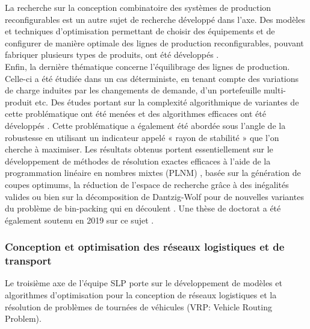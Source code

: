 La recherche sur la conception combinatoire des systèmes de production reconfigurables est un autre sujet de recherche développé dans l’axe. Des modèles et techniques d'optimisation permettant de choisir des équipements et de configurer de manière optimale des lignes de production reconfigurables, pouvant fabriquer plusieurs types de produits, ont été développés \cite{battaia:hal-01435089,battaia:hal-01523726,Dolgui2019,Dolgui2020,Battaia2020,yelleschaouche:hal-02485673}.\\

Enfin, la dernière thématique concerne l’équilibrage des lignes de production. Celle-ci a été étudiée dans un cas déterministe, en tenant compte des variations de charge induites par les changements de demande, d’un portefeuille multi-produit etc. Des études portant sur la complexité algorithmique de variantes de cette problématique ont été menées et des algorithmes efficaces ont été développés \cite{dolgui:hal-01688688,delorme:emse-01840007}. Cette problématique a également été abordée sous l’angle de la robustesse en utilisant un indicateur appelé « rayon de stabilité » que l’on cherche à maximiser. Les résultats obtenus portent essentiellement sur le développement de méthodes de résolution exactes efficaces à l’aide de la programmation linéaire en nombres mixtes (PLNM) \cite{rossi:hal-01301625}, basée sur la génération de coupes optimums, la réduction de l’espace de recherche grâce à des inégalités valides \cite{pirogov:hal-01614455,pirogov:hal-01832920,pirogov:hal-01713722} ou bien sur la décomposition de Dantzig-Wolf pour de nouvelles variantes du problème de bin-packing qui en découlent \cite{schepler:hal-01518356,schepler:hal-01474542,schepler:hal-02485676}. Une thèse de doctorat a été également soutenu en 2019 sur ce sujet \cite{pirogov:tel-02418792}.

  \subsubsection{Conception et optimisation des réseaux logistiques et de transport}
  		
   
Le troisième axe de l'équipe SLP porte sur le développement de modèles et algorithmes d'optimisation pour la conception de réseaux logistiques et la résolution de problèmes de tournées de véhicules (VRP: Vehicle Routing Problem).

